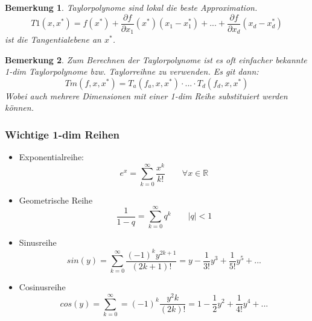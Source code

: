 \documentclass[12pt,a4paper]{article}%
\newtheorem{bem}{Bemerkung}[section]
\numberwithin{equation}{section}
\newcommand{\R}{\mathbb{R}} %
\def\dfp#1#2{\frac{\partial #1}{\partial #2}}
\numberwithin{equation}{subsection}
\begin{document}
  \begin{bem}
    Taylorpolynome sind lokal die beste Approximation.
    \begin{equation}
      T1(x, x^*) = f(x^*) + \dfp{f}{x_1}(x^*)(x_1-x_1^*) + ... + \dfp{f}{x_d}(x_d-x_d^*)
    \end{equation}
    ist die Tangentialebene an $x^*$.
  \end{bem}
  
  \begin{bem}
    Zum Berechnen der Taylorpolynome ist es oft einfacher bekannte 1-dim Taylorpolynome bzw. Taylorreihne zu verwenden. Es git dann:
    \begin{equation}
      Tm(f, x, x^*) = T_a(f_a, x, x^*) \cdot ... \cdot T_d(f_d, x, x^*)
    \end{equation}
    Wobei auch mehrere Dimensionen mit einer 1-dim Reihe substituiert werden können.
  \end{bem}
  
  \subsubsection{Wichtige 1-dim Reihen}
  \begin{itemize}
    \item Exponentialreihe:
    \begin{equation}
      e^x = \sum\limits_{k=0}^\infty \frac{x^k}{k!} \qquad \forall x \in \R
    \end{equation}
    \item Geometrische Reihe
    \begin{equation}
      \frac{1}{1-q} = \sum\limits_{k = 0}^\infty q^k \qquad |q| < 1
    \end{equation}
    \item Sinusreihe
    \begin{equation}
      sin(y) = \sum\limits_{k = 0}^\infty \frac{(-1)^k y^{2k+1}}{(2k+1)!} = y -\frac{1}{3!}y^3 + \frac{1}{5!}y^5 + ...
    \end{equation}
    \item Cosinusreihe
    \begin{equation}
      cos(y) = \sum\limits_{k = 0}^\infty = (-1)^k \frac{y^2k}{(2k)!} = 1 - \frac{1}{2}y^2 + \frac{1}{4!}y^4 + ...
    \end{equation}
  \end{itemize}
  
\end{document}
